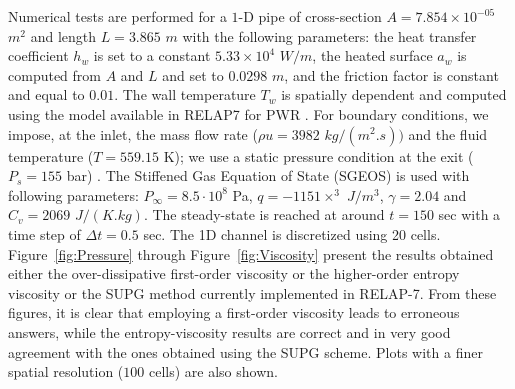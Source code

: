 \documentclass[12pt]{article}
\newcommand{\fig}[1]{Fig.~\ref{#1}} %
\begin{document}
Numerical tests are performed for a $1$-D pipe of cross-section $A = 7.854\times 10^{-05}$ $m^2$ and length $L=3.865$ $m$ with the following parameters: the heat transfer coefficient $h_w$ is set to a constant $5.33\times 10^4$ $W/m$, the heated surface $a_w$ is computed from $A$ and $L$ and set to $0.0298$ $m$, and the friction factor is constant and equal to $0.01$. The wall temperature $T_w$ is spatially dependent and computed using the model available in RELAP7 for PWR \cite{Relap7PWR}. 
For boundary conditions, we impose, at the inlet, the mass flow rate ($\rho u = 3982$ $kg/(m^2.s))$ and the fluid temperature ($T = 559.15$ K); we use a static pressure condition at the exit ($P_s = 155$ bar) . The Stiffened Gas Equation of State (SGEOS) is used \cite{SGEOS} with following parameters: $P_{\infty} = 8.5 \cdot 10^8$ Pa, $q = -1151\times^3$ $J/m^3$, $\gamma = 2.04$ and $C_v = 2069$ $J/(K.kg)$. The steady-state is reached at around $t=150$ sec with a time step of $\Delta t = 0.5$ sec. The 1D channel is discretized using 20 cells. Figure~\ref{fig:Pressure} through Figure~\ref{fig:Viscosity} present the results obtained either the over-dissipative first-order viscosity or the higher-order entropy viscosity or the SUPG method currently implemented in RELAP-7. From these figures, it is clear that employing a first-order viscosity leads to erroneous answers, while the entropy-viscosity results are correct and in very good agreement with the ones obtained using the SUPG scheme. Plots with a finer spatial resolution ($100$ cells) are also shown. 
\end{document}
